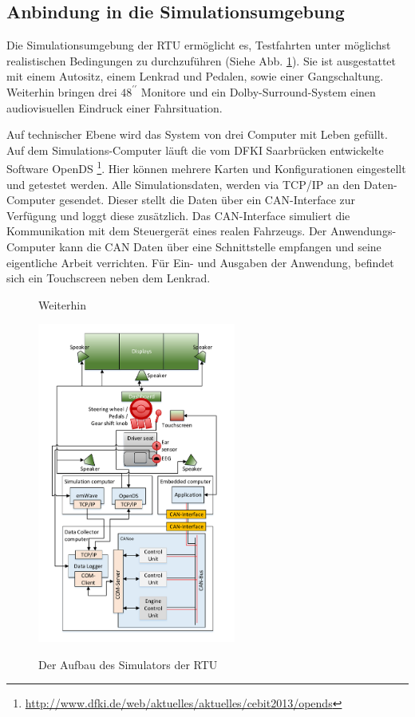 {\subsection{Anbindung in die Simulationsumgebung}
Die Simulationsumgebung der \acl{RTU} ermöglicht es, Testfahrten unter möglichst realistischen Bedingungen zu durchzuführen (Siehe Abb. \ref{fig:architecure}). Sie ist ausgestattet mit einem Autositz, einem Lenkrad und Pedalen, sowie einer Gangschaltung. Weiterhin bringen drei $48^{\prime\prime}$ Monitore und ein Dolby-Surround-System einen audiovisuellen Eindruck einer Fahrsituation.

Auf technischer Ebene wird das System von drei Computer mit Leben gefüllt. Auf dem Simulations-Computer läuft die vom DFKI Saarbrücken entwickelte Software OpenDS \footnote{\url{http://www.dfki.de/web/aktuelles/aktuelles/cebit2013/opends}}. Hier können mehrere Karten und Konfigurationen eingestellt und getestet werden. Alle Simulationsdaten, werden via TCP/IP an den Daten-Computer gesendet. Dieser stellt die Daten über ein CAN-Interface zur Verfügung und loggt diese zusätzlich. Das CAN-Interface simuliert die Kommunikation mit dem Steuergerät eines realen Fahrzeugs. Der Anwendungs-Computer kann die CAN Daten über eine Schnittstelle empfangen und seine eigentliche Arbeit verrichten. Für Ein- und Ausgaben der Anwendung, befindet sich ein Touchscreen neben dem Lenkrad.
\begin{figure}[h]Weiterhin 
  \begin{center}
    \includegraphics[width=6.5cm]{img/architecture}
    \label{fig:architecure}
    \caption[Aufbau des Simulators]{Der Aufbau des Simulators der \acl{RTU}}
  \end{center}
\end{figure}

}

